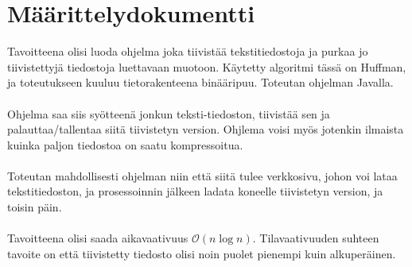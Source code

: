 \documentclass[a4paper]{article}
\begin{document}
\part*{Määrittelydokumentti}

Tavoitteena olisi luoda ohjelma joka tiivistää tekstitiedostoja ja purkaa jo tiivistettyjä tiedostoja luettavaan  muotoon. Käytetty algoritmi tässä on Huffman, ja toteutukseen kuuluu tietorakenteena binääripuu. Toteutan ohjelman Javalla.
\\
\\
Ohjelma saa siis syötteenä jonkun teksti-tiedoston, tiivistää sen ja palauttaa/tallentaa siitä tiivistetyn version. Ohjlema voisi myös jotenkin ilmaista kuinka paljon tiedostoa on saatu kompressoitua.
\\
\\
Toteutan mahdollisesti ohjelman niin että siitä tulee verkkosivu, johon voi lataa tekstitiedoston, ja prosessoinnin jälkeen ladata koneelle tiivistetyn version, ja toisin päin.
\\
\\
Tavoitteena olisi saada aikavaativuus $\mathcal{O}(n\log{}n)$. Tilavaativuuden suhteen tavoite on että tiivistetty tiedosto olisi noin puolet pienempi kuin alkuperäinen.
\end{document}
